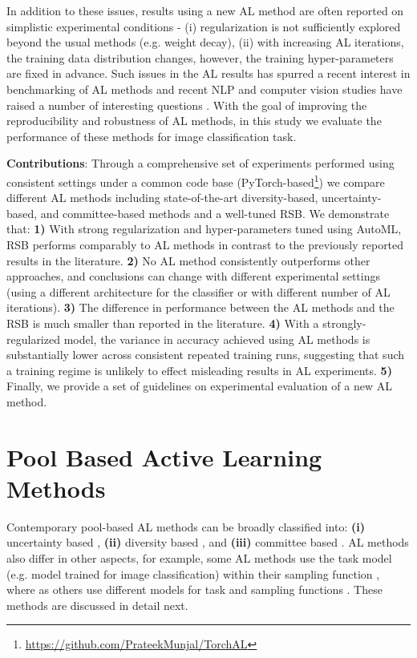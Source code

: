 \documentclass[10pt,twocolumn,letterpaper]{article}
\begin{document}
\noindent In addition to these issues, results using a new AL method are often reported on simplistic experimental conditions - (i) regularization is not sufficiently explored beyond the usual methods (e.g. weight decay), (ii) with increasing AL iterations, the training data distribution changes, however, the training hyper-parameters are fixed in advance. Such issues in the AL results has spurred a recent interest in benchmarking of AL methods and recent NLP and computer vision studies have raised a number of interesting questions \cite{inspire1_DBLP:journals/corr/abs-1807-04801, inspire2_prabhu2019sampling,mittal2019parting}. With the goal of improving the reproducibility and robustness of AL methods, in this study we evaluate the performance of these methods for image classification task.

\noindent \textbf{Contributions}: Through a comprehensive set of experiments performed using consistent settings under a common code base (PyTorch-based\footnote{\url{https://github.com/PrateekMunjal/TorchAL}})
we compare different AL methods including state-of-the-art diversity-based, uncertainty-based, and committee-based methods \cite{VAAL_sinha2019variational, coreset_sener2018active, Ensembles_Beluch2018ThePO, DBAL_gal2017deep} and a well-tuned RSB. We demonstrate that:
\textbf{1)} With strong regularization and hyper-parameters tuned using AutoML, RSB performs comparably to AL methods in contrast to the previously reported results in the literature.
\textbf{2)} No AL method consistently outperforms other approaches, and conclusions can change with different experimental settings (\eg using a different architecture for the classifier or with different number of AL iterations).
\textbf{3)} The difference in performance between the AL methods and the RSB is much smaller than reported in the literature. \textbf{4)} With a strongly-regularized model, the variance in accuracy achieved using AL methods is substantially lower across consistent repeated training runs, suggesting that such a training regime is unlikely to effect misleading results in AL experiments.
    \textbf{5)} Finally, we provide a set of guidelines on experimental evaluation of a new AL method.


\section{Pool Based Active Learning Methods}

Contemporary pool-based AL methods can be broadly classified into: \textbf{(i)} uncertainty based \cite{VAAL_sinha2019variational,DBAL_gal2017deep,BatchBald_DBLP:journals/corr/abs-1906-08158}, \textbf{(ii)} diversity based \cite{coreset_sener2018active, Adv_AL_DBLP:journals/corr/abs-1802-09841}, and \textbf{(iii)} committee based \cite{Ensembles_Beluch2018ThePO}. AL methods also differ in other aspects, for example, some AL methods use the task model (e.g. model trained for image classification) within their sampling function \cite{DBAL_gal2017deep, coreset_sener2018active}, where as others use different models for task and sampling functions \cite{VAAL_sinha2019variational , Ensembles_Beluch2018ThePO}.
These methods are discussed in detail next.
\end{document}
